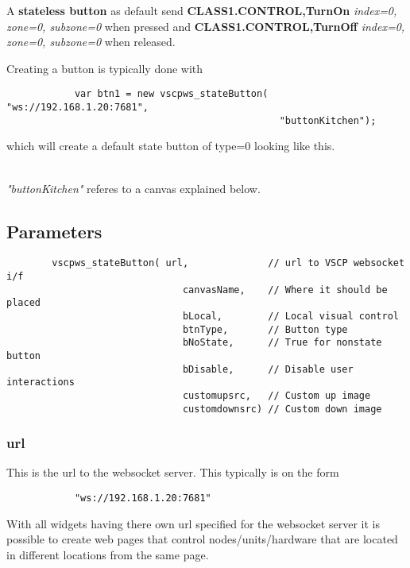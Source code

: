 \documentclass{article}
\begin{document}
        A \textbf{stateless button} as default send \textbf{CLASS1.CONTROL,TurnOn} 
        \textit{index=0, zone=0, subzone=0} when 
        pressed and \textbf{CLASS1.CONTROL,TurnOff} \textit{index=0, zone=0, subzone=0} when 
        released.
        \par 
        Creating a button is typically done with    
        \begin{verbatim}
            var btn1 = new vscpws_stateButton( "ws://192.168.1.20:7681", 
                                                "buttonKitchen");
        \end{verbatim}
        which will create a default state button of type=0 looking like this. 
        \par 
            
            \\
        
        \textit{"buttonKitchen"} referes
        to a canvas explained below.
        
        \subsection*{Parameters}
        \begin{verbatim}
        vscpws_stateButton( url,              // url to VSCP websocket i/f
                               canvasName,    // Where it should be placed
                               bLocal,        // Local visual control      
                               btnType,       // Button type   
                               bNoState,      // True for nonstate button 
                               bDisable,      // Disable user interactions
                               customupsrc,   // Custom up image
                               customdownsrc) // Custom down image
        \end{verbatim}                       
        \subsubsection*{url}
        This is the url to the websocket server. This typically is on the form
        \begin{verbatim}
            "ws://192.168.1.20:7681"
        \end{verbatim}
        With all widgets having there own url specified for the websocket server 
        it is possible to create web pages that control nodes/units/hardware that
        are located in different locations from the same page. 
\end{document}
